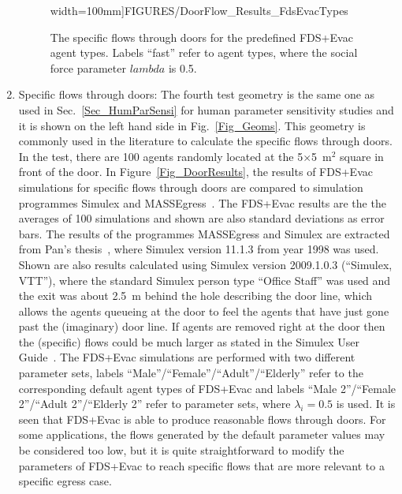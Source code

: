 \documentclass[12pt,a4paper,final,twoside]{stylevk}
\begin{document}
\begin{enumerate}
\begin{figure}[!b]
{  width=100mm]{FIGURES/DoorFlow_Results_FdsEvacTypes}} 
  \caption{The specific flows through doors for the predefined
    FDS+Evac agent types. Labels ``fast'' refer to agent types, where
    the social force parameter $lambda$ is 0.5.}\label{Fig_DoorResultsHumanTypes}  
\end{figure}
%

%
\item Specific flows through doors: The fourth test geometry is the
  same one as used in Sec.~\ref{Sec_HumParSensi} for human
  parameter sensitivity studies and it is shown on the left hand side
  in Fig.~\ref{Fig_Geoms}.  This geometry is commonly used in the
  literature to calculate the specific flows through doors.  In the
  test, there are 100 agents randomly located at the
  5$\times$5~$\mathrm{m^2}$ square in front of the door.  In
  Figure~\ref{Fig_DoorResults}, the results of FDS+Evac simulations
  for specific flows through doors are compared to simulation
  programmes Simulex and MASSEgress~\cite{Pan06}.  The FDS+Evac
  results are the the averages of 100 simulations and shown are also
  standard deviations as error bars. The results of the programmes
  MASSEgress and Simulex are extracted from Pan's thesis~\cite{Pan06},
  where Simulex version 11.1.3 from year 1998 was used.  Shown are
  also results calculated using Simulex version 2009.1.0.3 (``Simulex,
  VTT''), where the standard Simulex person type ``Office Staff'' was
  used and the exit was about 2.5~m behind the hole describing the
  door line, which allows the agents queueing at the door to feel the
  agents that have just gone past the (imaginary) door line.  If
  agents are removed right at the door then the (specific) flows could
  be much larger as stated in the Simulex User Guide~\cite{IES2009}.
  The FDS+Evac simulations are performed with two different parameter
  sets, labels ``Male''/``Female''/``Adult''/``Elderly'' refer to the
  corresponding default agent types of FDS+Evac and labels ``Male
  2''/``Female 2''/``Adult 2''/``Elderly 2'' refer to parameter sets,
  where $\lambda_i = 0.5$ is used.  It is seen that FDS+Evac is able
  to produce reasonable flows through doors.  For some applications,
  the flows generated by the default parameter values may be
  considered too low, but it is quite straightforward to modify the
  parameters of FDS+Evac to reach specific flows that are more
  relevant to a specific egress case.




\end{enumerate}
\end{document}
